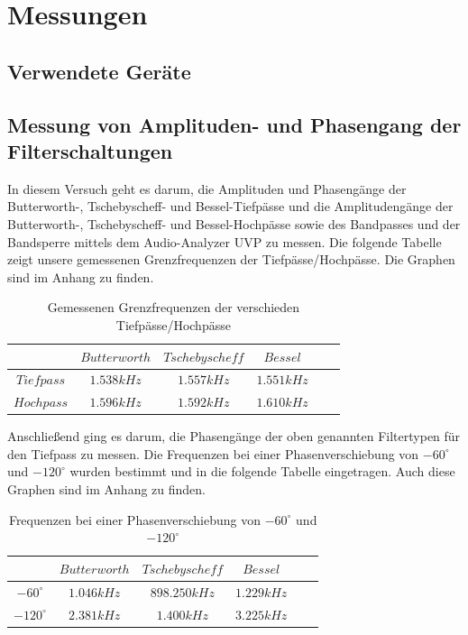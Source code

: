 \section{Messungen}
\subsection{Verwendete Geräte}


\newpage

\subsection{Messung von Amplituden- und Phasengang der Filterschaltungen}
\noindent In diesem Versuch geht es darum, die Amplituden und Phasengänge der Butterworth-, Tschebyscheff- und Bessel-Tiefpässe und die Amplitudengänge der Butterworth-, Tschebyscheff- und Bessel-Hochpässe sowie des Bandpasses und der Bandsperre mittels dem Audio-Analyzer UVP zu messen. Die folgende Tabelle zeigt unsere gemessenen Grenzfrequenzen der Tiefpässe/Hochpässe. Die Graphen sind im Anhang zu finden.

	\begin{table}[h]
		\centering
		\begin{tabular}{c|c|c|c|c|c}
			$ $        & $Butterworth$ & $Tschebyscheff$ & $Bessel$  \\
			\hline
			$Tiefpass$ & $1.538kHz$    & $1.557kHz$      & $1.551kHz$  \\
			$Hochpass$ & $1.596kHz$    & $1.592kHz$      & $1.610kHz$  \\   
		\end{tabular}
		\caption{Gemessenen Grenzfrequenzen der verschieden Tiefpässe/Hochpässe}
		\label{tab:grenzfrequnzen_hp_tp}
	\end{table}
	
\noindent Anschließend ging es darum, die Phasengänge der oben genannten Filtertypen für den Tiefpass zu messen. Die Frequenzen bei einer Phasenverschiebung von $-60^\circ$ und $-120^\circ$ wurden bestimmt und in die folgende Tabelle eingetragen. Auch diese Graphen sind im Anhang zu finden.

\begin{table}[h]
	\centering
		\begin{tabular}{c|c|c|c|c|c}
			$ $           & $Butterworth$ & $Tschebyscheff$ & $Bessel$  \\
			\hline		
		    $-60^\circ $ & $1.046kHz$    & $898.250kHz$    & $1.229kHz$  \\
			$-120^\circ$ & $2.381kHz$    & $1.400kHz$      & $3.225kHz$  \\   
	\end{tabular}
	\caption{Frequenzen bei einer Phasenverschiebung von $-60^\circ$ und $-120^\circ$ }
	\label{tab:phasenverschiebung_hp_tp}
\end{table}
	
